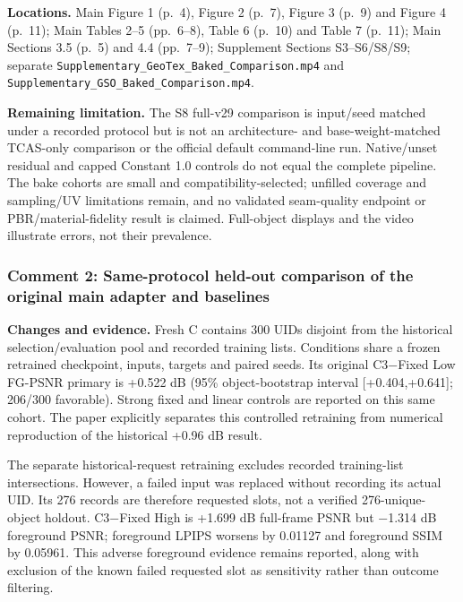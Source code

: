 \documentclass[
  10pt,
]{article}
\begin{document}
\textbf{Locations.} Main Figure 1 (p.~4), Figure 2 (p.~7), Figure 3
(p.~9) and Figure 4 (p.~11); Main Tables 2--5 (pp.~6--8), Table 6
(p.~10) and Table 7 (p.~11); Main Sections 3.5 (p.~5) and 4.4
(pp.~7--9); Supplement Sections S3--S6/S8/S9; separate
\texttt{Supplementary\_GeoTex\_Baked\_Comparison.mp4} and
\texttt{Supplementary\_GSO\_Baked\_Comparison.mp4}.

\textbf{Remaining limitation.} The S8 full-v29 comparison is input/seed
matched under a recorded protocol but is not an architecture- and
base-weight-matched TCAS-only comparison or the official default
command-line run. Native/unset residual and capped Constant 1.0 controls
do not equal the complete pipeline. The bake cohorts are small and
compatibility-selected; unfilled coverage and sampling/UV limitations
remain, and no validated seam-quality endpoint or PBR/material-fidelity
result is claimed. Full-object displays and the video illustrate errors,
not their prevalence.

\hypertarget{comment-2-same-protocol-held-out-comparison-of-the-original-main-adapter-and-baselines}{%
\subsubsection{Comment 2: Same-protocol held-out comparison of the
original main adapter and
baselines}\label{comment-2-same-protocol-held-out-comparison-of-the-original-main-adapter-and-baselines}}

\textbf{Changes and evidence.} Fresh C contains 300 UIDs disjoint from
the historical selection/evaluation pool and recorded training lists.
Conditions share a frozen retrained checkpoint, inputs, targets and
paired seeds. Its original C3−Fixed Low FG-PSNR primary is +0.522 dB
(95\% object-bootstrap interval {[}+0.404,+0.641{]}; 206/300 favorable).
Strong fixed and linear controls are reported on this same cohort. The
paper explicitly separates this controlled retraining from numerical
reproduction of the historical +0.96 dB result.

The separate historical-request retraining excludes recorded
training-list intersections. However, a failed input was replaced
without recording its actual UID. Its 276 records are therefore
requested slots, not a verified 276-unique-object holdout. C3−Fixed High
is +1.699 dB full-frame PSNR but −1.314 dB foreground PSNR; foreground
LPIPS worsens by 0.01127 and foreground SSIM by 0.05961. This adverse
foreground evidence remains reported, along with exclusion of the known
failed requested slot as sensitivity rather than outcome filtering.
\end{document}
